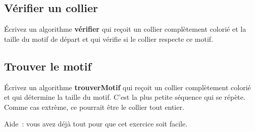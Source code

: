 		\subsection*{Vérifier un collier}
		
			Écrivez un algorithme \textbf{vérifier}
			qui reçoit un collier complètement colorié
			et la taille du motif de départ et qui vérifie
			si le collier respecte ce motif.
		
		\subsection*{Trouver le motif}
		
			Écrivez un algorithme \textbf{trouverMotif}
			qui reçoit un collier complètement colorié
			et qui détermine la taille du motif.
			C’est la plus petite séquence qui se répète.
			Comme cas extrème, ce pourrait être le collier tout entier.
		
			Aide~: vous avez déjà tout pour que cet exercice soit facile.

